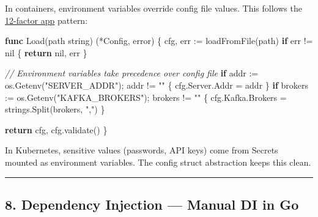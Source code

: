 \documentclass[
]{article}
\newenvironment{Shaded}{}{}
\newcommand{\CommentTok}[1]{\textcolor[rgb]{0.38,0.63,0.69}{\textit{#1}}}
\newcommand{\ControlFlowTok}[1]{\textcolor[rgb]{0.00,0.44,0.13}{\textbf{#1}}}
\newcommand{\DataTypeTok}[1]{\textcolor[rgb]{0.56,0.13,0.00}{#1}}
\newcommand{\KeywordTok}[1]{\textcolor[rgb]{0.00,0.44,0.13}{\textbf{#1}}}
\newcommand{\NormalTok}[1]{#1}
\newcommand{\OperatorTok}[1]{\textcolor[rgb]{0.40,0.40,0.40}{#1}}
\newcommand{\OtherTok}[1]{\textcolor[rgb]{0.00,0.44,0.13}{#1}}
\newcommand{\StringTok}[1]{\textcolor[rgb]{0.25,0.44,0.63}{#1}}
\begin{document}
In containers, environment variables override config file values. This
follows the \href{https://12factor.net/}{12-factor app} pattern:

\begin{Shaded}
\begin{Highlighting}[]
\KeywordTok{func}\NormalTok{ Load}\OperatorTok{(}\NormalTok{path }\DataTypeTok{string}\OperatorTok{)} \OperatorTok{(*}\NormalTok{Config}\OperatorTok{,} \DataTypeTok{error}\OperatorTok{)} \OperatorTok{\{}
\NormalTok{    cfg}\OperatorTok{,}\NormalTok{ err }\OperatorTok{:=}\NormalTok{ loadFromFile}\OperatorTok{(}\NormalTok{path}\OperatorTok{)}
    \ControlFlowTok{if}\NormalTok{ err }\OperatorTok{!=} \OtherTok{nil} \OperatorTok{\{}
        \ControlFlowTok{return} \OtherTok{nil}\OperatorTok{,}\NormalTok{ err}
    \OperatorTok{\}}

    \CommentTok{// Environment variables take precedence over config file}
    \ControlFlowTok{if}\NormalTok{ addr }\OperatorTok{:=}\NormalTok{ os}\OperatorTok{.}\NormalTok{Getenv}\OperatorTok{(}\StringTok{"SERVER\_ADDR"}\OperatorTok{);}\NormalTok{ addr }\OperatorTok{!=} \StringTok{""} \OperatorTok{\{}
\NormalTok{        cfg}\OperatorTok{.}\NormalTok{Server}\OperatorTok{.}\NormalTok{Addr }\OperatorTok{=}\NormalTok{ addr}
    \OperatorTok{\}}
    \ControlFlowTok{if}\NormalTok{ brokers }\OperatorTok{:=}\NormalTok{ os}\OperatorTok{.}\NormalTok{Getenv}\OperatorTok{(}\StringTok{"KAFKA\_BROKERS"}\OperatorTok{);}\NormalTok{ brokers }\OperatorTok{!=} \StringTok{""} \OperatorTok{\{}
\NormalTok{        cfg}\OperatorTok{.}\NormalTok{Kafka}\OperatorTok{.}\NormalTok{Brokers }\OperatorTok{=}\NormalTok{ strings}\OperatorTok{.}\NormalTok{Split}\OperatorTok{(}\NormalTok{brokers}\OperatorTok{,} \StringTok{","}\OperatorTok{)}
    \OperatorTok{\}}

    \ControlFlowTok{return}\NormalTok{ cfg}\OperatorTok{,}\NormalTok{ cfg}\OperatorTok{.}\NormalTok{validate}\OperatorTok{()}
\OperatorTok{\}}
\end{Highlighting}
\end{Shaded}

In Kubernetes, sensitive values (passwords, API keys) come from Secrets
mounted as environment variables. The config struct abstraction keeps
this clean.

\begin{center}\rule{0.5\linewidth}{0.5pt}\end{center}

\hypertarget{dependency-injection-manual-di-in-go}{%
\subsection{8. Dependency Injection --- Manual DI in
Go}\label{dependency-injection-manual-di-in-go}}
\end{document}
